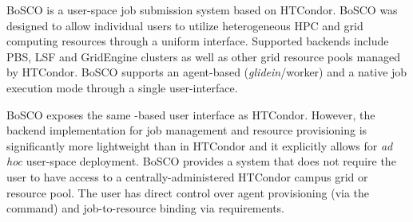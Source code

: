 \documentclass{sig-alternate}
\begin{document}


BoSCO is a user-space job submission system based on HTCondor. BoSCO was
designed to allow individual users to utilize heterogeneous HPC and grid
computing resources through a uniform interface. Supported backends include
PBS, LSF and GridEngine clusters as well as other grid resource pools managed
by HTCondor. BoSCO supports an agent-based (\textit{glidein}/worker) and a
native job execution mode through a single user-interface.

BoSCO exposes the same -based user interface as HTCondor.
However, the backend implementation for job management and resource
provisioning is significantly more lightweight than in HTCondor and it
explicitly allows for \textit{ad hoc} user-space deployment. BoSCO provides a
\pilot system that does not require the user to have access to a
centrally-administered HTCondor campus grid or resource pool. The user has
direct control over \pilot agent provisioning (via the 
command) and job-to-resource binding via  requirements.
\end{document}
